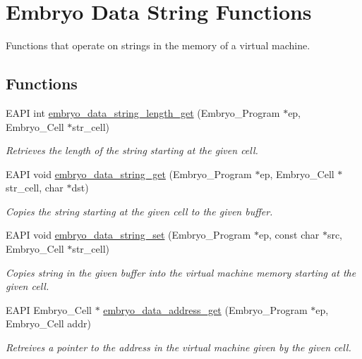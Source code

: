 \hypertarget{group__Embryo__Data__String__Group}{
\section{Embryo Data String Functions}
\label{group__Embryo__Data__String__Group}
}
Functions that operate on strings in the memory of a virtual machine.  
\subsection*{Functions}
\begin{CompactItemize}
\item 
EAPI int \hyperlink{group__Embryo__Data__String__Group_g017e96ff1b5c2806c462ba08416a72d9}{embryo\_\-data\_\-string\_\-length\_\-get} (Embryo\_\-Program $\ast$ep, Embryo\_\-Cell $\ast$str\_\-cell)
\begin{CompactList}\small\item\em Retrieves the length of the string starting at the given cell. \item\end{CompactList}\item 
EAPI void \hyperlink{group__Embryo__Data__String__Group_g6056316c070a146eb63f08e8e4176328}{embryo\_\-data\_\-string\_\-get} (Embryo\_\-Program $\ast$ep, Embryo\_\-Cell $\ast$str\_\-cell, char $\ast$dst)
\begin{CompactList}\small\item\em Copies the string starting at the given cell to the given buffer. \item\end{CompactList}\item 
EAPI void \hyperlink{group__Embryo__Data__String__Group_g2f1b7e5ce221aaada5663e46f2578815}{embryo\_\-data\_\-string\_\-set} (Embryo\_\-Program $\ast$ep, const char $\ast$src, Embryo\_\-Cell $\ast$str\_\-cell)
\begin{CompactList}\small\item\em Copies string in the given buffer into the virtual machine memory starting at the given cell. \item\end{CompactList}\item 
EAPI Embryo\_\-Cell $\ast$ \hyperlink{group__Embryo__Data__String__Group_ga9c6beeb074c4495711c4817874ce04e}{embryo\_\-data\_\-address\_\-get} (Embryo\_\-Program $\ast$ep, Embryo\_\-Cell addr)
\begin{CompactList}\small\item\em Retreives a pointer to the address in the virtual machine given by the given cell. \item\end{CompactList}\end{CompactItemize}


